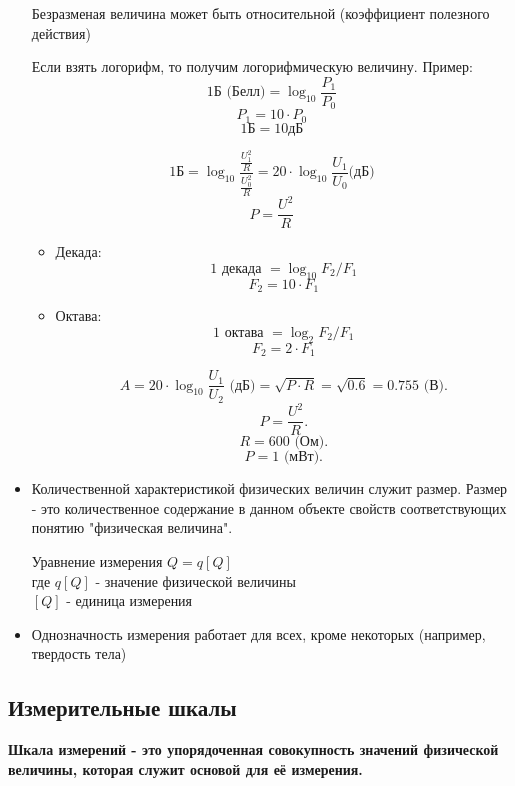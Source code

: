 \documentclass[a4paper, 12pt]{article}
\begin{document}
\begin{itemize}
	      Безразменая величина может быть относительной (коэффициент полезного
	      действия)

	      Если взять логорифм, то получим логорифмическую величину.
	      Пример: \[ 1 \text{Б (Белл)} = \log_{10}{\frac{P_1}{P_0}}\]
	      \[ P_1 = 10 \cdot P_0 \]
	      \[ 1 \text{Б} = 10 \text{дБ} \]


	      \[ 1 \text{Б} = \log_{10}{\frac{\frac{U_1^2}{R}}{\frac{U_0^2}{R}}} = 20
		      \cdot \log_{10}{\frac{U_1}{U_0}} \text{(дБ)}\]
	      \[ P = \frac{U^2}{R} \]
	      \begin{itemize}
		      \item Декада:
		            \[ 1 \text{ декада } = \log_{10}{F_2 / F_1} \]
		            \[ F_2 = 10 \cdot F_1 \]
		      \item Октава:
		            \[ 1 \text{ октава } = \log_{2}{F_2 / F_1} \]
		            \[ F_2 = 2 \cdot F_1 \]

		            \[
			            A = 20 \cdot \log_{10}{\frac{U_1}{U_2}} \text{ (дБ)} = \sqrt{P
				            \cdot R }= \sqrt{0.6} = 0.755 \text{ (В)}
			            .\]
		            \[
			            P = \frac{U^2}{R}
			            .\]
		            \[
			            R = 600 \text{ (Ом)}
			            .\]
		            \[
			            P = 1 \text{ (мВт)}
			            .\]
	      \end{itemize}
	\item Количественной характеристикой физических величин служит размер. Размер - это
	      количественное содержание в данном объекте свойств соответствующих понятию
	      "физическая величина".

	      Уравнение измерения \( Q = q[Q] \)\\
	      где \( q[Q] \) - значение физической величины\\
	      \( [Q] \) - единица измерения
	\item	Однозначность измерения работает для всех, кроме некоторых (например,
	      твердость тела)
\end{itemize}

\subsection{Измерительные шкалы}
\textbf{Шкала измерений - это упорядоченная совокупность значений физической величины,
которая служит основой для её измерения.}
\end{document}
